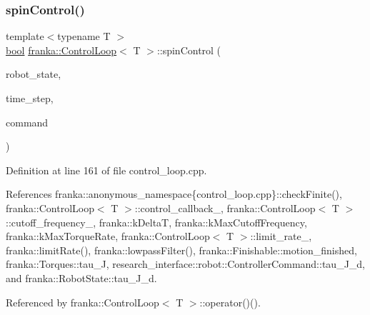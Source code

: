 \subsubsection{\texorpdfstring{spin\+Control()}{spinControl()}}
{\footnotesize\ttfamily template$<$typename T $>$ \\
\hyperlink{classbool}{bool} \hyperlink{classfranka_1_1ControlLoop}{franka\+::\+Control\+Loop}$<$ T $>$\+::spin\+Control (\begin{DoxyParamCaption}\item[{const \hyperlink{structfranka_1_1RobotState}{Robot\+State} \&}]{robot\+\_\+state,  }\item[{\hyperlink{classfranka_1_1Duration}{franka\+::\+Duration}}]{time\+\_\+step,  }\item[{\hyperlink{structresearch__interface_1_1robot_1_1ControllerCommand}{research\+\_\+interface\+::robot\+::\+Controller\+Command} $\ast$}]{command }\end{DoxyParamCaption})\hspace{0.3cm}{\ttfamily [protected]}}



Definition at line 161 of file control\+\_\+loop.\+cpp.



References franka\+::anonymous\+\_\+namespace\{control\+\_\+loop.\+cpp\}\+::check\+Finite(), franka\+::\+Control\+Loop$<$ T $>$\+::control\+\_\+callback\+\_\+, franka\+::\+Control\+Loop$<$ T $>$\+::cutoff\+\_\+frequency\+\_\+, franka\+::k\+DeltaT, franka\+::k\+Max\+Cutoff\+Frequency, franka\+::k\+Max\+Torque\+Rate, franka\+::\+Control\+Loop$<$ T $>$\+::limit\+\_\+rate\+\_\+, franka\+::limit\+Rate(), franka\+::lowpass\+Filter(), franka\+::\+Finishable\+::motion\+\_\+finished, franka\+::\+Torques\+::tau\+\_\+J, research\+\_\+interface\+::robot\+::\+Controller\+Command\+::tau\+\_\+\+J\+\_\+d, and franka\+::\+Robot\+State\+::tau\+\_\+\+J\+\_\+d.



Referenced by franka\+::\+Control\+Loop$<$ T $>$\+::operator()().



